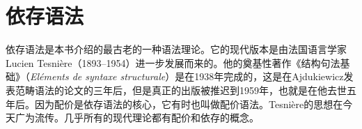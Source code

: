 \chapter{依存语法}
\label{Kapitel-DG}

依存语法是本书介绍的最古老的一种语法理论。它的现代版本是由法国语言学家Lucien Tesnière（1893--1954）进一步发展而来的。他的奠基性著作《结构句法基础》（\emph{Eléments de syntaxe structurale}）是在1938年完成的，这是在Ajdukiewicz发表范畴语法的论文的三年后\citeyearpar{Ajdukiewicz35a-u}，但是真正的出版被推迟到1959年，也就是在他去世五年后\nocite{Tesniere59a-u}。因为配价是依存语法的核心，它有时也叫做配价语法。Tesnière的思想在今天广为流传。几乎所有的现代理论都有配价和依存的概念\citep[--263, 284]{AF2010a}。

